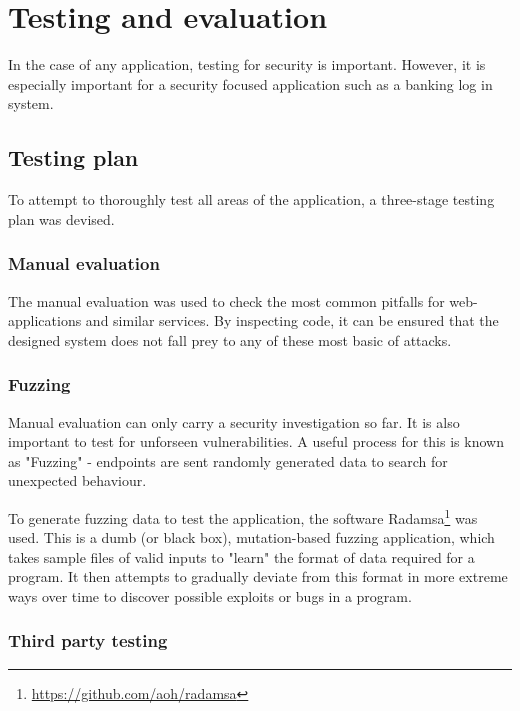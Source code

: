 \section{Testing and evaluation}

In the case of any application, testing for security is important. However, it is especially important for a security focused application such as a banking log in system. 

\subsection{Testing plan}

To attempt to thoroughly test all areas of the application, a three-stage testing plan was devised. 

\subsubsection{Manual evaluation}\label{manualEvaluation}

The manual evaluation was used to check the most common pitfalls for web-applications and similar services. By inspecting code, it can be ensured that the designed system does not fall prey to any of these most basic of attacks.

\subsubsection{Fuzzing}\label{fuzzing}

Manual evaluation can only carry a security investigation so far. It is also important to test for unforseen vulnerabilities. A useful process for this is known as "Fuzzing" - endpoints are sent randomly generated data to search for unexpected behaviour.

To generate fuzzing data to test the application, the software Radamsa\footnote{
    \url{https://github.com/aoh/radamsa}
} was used. This is a dumb (or black box), mutation-based fuzzing application, which takes sample files of valid inputs to "learn" the format of data required for a program. It  then attempts to gradually deviate from this format in more extreme ways over time to discover possible exploits or bugs in a program.



\subsubsection{Third party testing}

